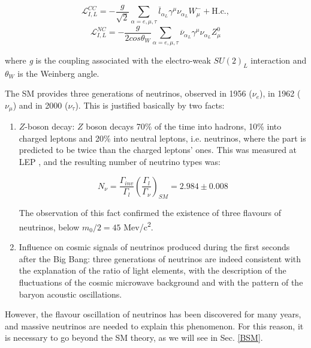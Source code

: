 \begin{equation}
\label{cc_lagrangian}
    \mathcal{L}^{CC}_{I,L} = -\frac{g}{\sqrt{2}}\sum_{\alpha = e,\mu,\tau} \overline{l}_{\alpha_L}\gamma^{\mu} \nu_{\alpha_L} W^{-}_{\mu} + \text{H.c.},
\end{equation}
\begin{equation}
\label{nc_lagrangian}
    \mathcal{L}^{NC}_{I,L} = -\frac{g}{2cos\theta_W}\sum_{\alpha = e,\mu,\tau} \overline{\nu}_{\alpha_L} \gamma^{\mu} \nu_{\alpha_L} Z^0_\mu
\end{equation}

where \textit{g} is the coupling associated with the electro-weak $SU(2)_L$ interaction and $\theta_W$ is the Weinberg angle.

The SM provides three generations of neutrinos, observed in 1956 ($\nu_e$), in 1962 ($\nu_\mu$) and in 2000 ($\nu_\tau$). This is justified basically by two facts:
\begin{enumerate}
    \item $Z$-boson decay: $Z$ boson decays 70\% of the time into hadrons, 10\% into charged leptons and 20\% into neutral leptons, i.e. neutrinos, where the   part is predicted to be twice than the charged leptons' ones. 
    This was measured at LEP \cite{pdg:2022ynf}, and the resulting number of neutrino types was: 
    
    \begin{equation*}
        N_\nu = \frac{\Gamma_{inv}}{\Gamma_l}\left(\frac{\Gamma_l}{\Gamma_\nu}\right)_{SM} = 2.984 \pm 0.008
    \end{equation*}
    
    The observation of this fact confirmed the existence of three flavours of neutrinos, below $m_0/2 = 45$ Mev/c\textsuperscript{2}. 
    \item Influence on cosmic signals of neutrinos produced during the first seconds after the Big Bang: three generations of neutrinos are indeed consistent with the explanation of the ratio of light elements, with the description of the fluctuations of the cosmic microwave background and with the pattern of the baryon acoustic oscillations.
\end{enumerate}

However, the flavour oscillation of neutrinos has been discovered for many years, and massive neutrinos are needed to explain this phenomenon. For this reason, it is necessary to go beyond the SM theory, as we will see in Sec. \ref{BSM}.

